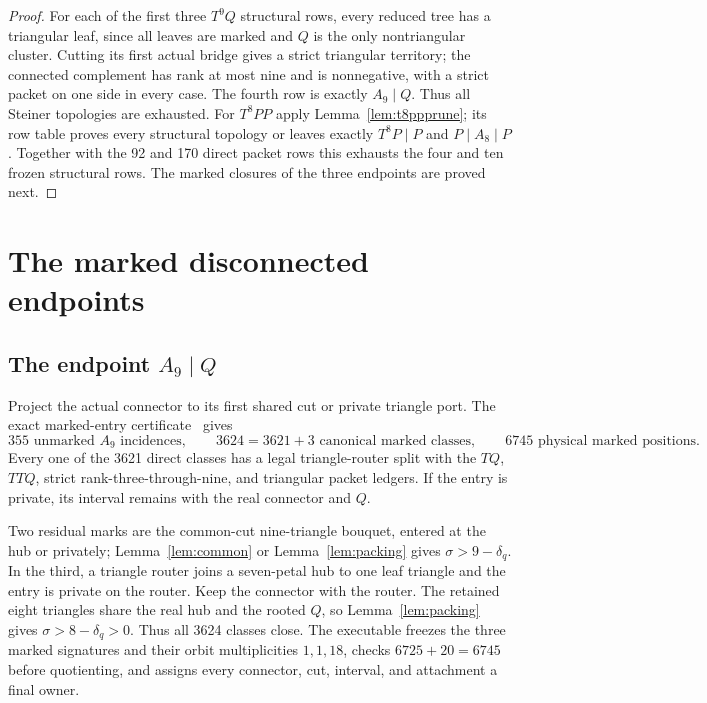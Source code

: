 \documentclass[11pt]{article}
\newcommand{\sig}{\sigma}
\begin{document}
\begin{proof}
For each of the first three $T^9Q$ structural rows, every reduced tree has a
triangular leaf, since all leaves are marked and $Q$ is the only nontriangular
cluster.  Cutting its first actual bridge gives a strict triangular territory;
the connected complement has rank at most nine and is nonnegative, with a
strict packet on one side in every case.  The fourth row is exactly
$A_9\mid Q$.  Thus all Steiner topologies are exhausted.  For $T^8PP$ apply
Lemma~\ref{lem:t8ppprune}; its row table proves every structural topology or
leaves exactly $T^8P\mid P$ and $P\mid A_8\mid P$.  Together with the 92 and
170 direct packet rows this exhausts the four and ten frozen structural rows.
The marked closures of the three endpoints are proved next.
\end{proof}

\section{The marked disconnected endpoints}

\subsection{The endpoint \texorpdfstring{$A_9\mid Q$}{A9 | Q}}

Project the actual connector to its first shared cut or private triangle port.
The exact marked-entry certificate~\cite{T9QMarked} gives
\[
 355\text{ unmarked }A_9\text{ incidences},\qquad
 3624=3621+3\text{ canonical marked classes},\qquad
 6745\text{ physical marked positions}.
\]
Every one of the 3621 direct classes has a legal triangle-router split with
the $TQ$, $TTQ$, strict rank-three-through-nine, and triangular packet ledgers.
If the entry is private, its interval remains with the real connector and $Q$.

Two residual marks are the common-cut nine-triangle bouquet, entered at the
hub or privately; Lemma~\ref{lem:common} or Lemma~\ref{lem:packing} gives
$\sig>9-\delta_q$.  In the third, a triangle router joins a seven-petal hub to
one leaf triangle and the entry is private on the router.  Keep the connector
with the router.  The retained eight triangles share the real hub and the
rooted $Q$, so Lemma~\ref{lem:packing} gives $\sig>8-\delta_q>0$.  Thus all
3624 classes close.  The executable freezes the three marked signatures and
their orbit multiplicities $1,1,18$, checks $6725+20=6745$ before quotienting,
and assigns every connector, cut, interval, and attachment a final owner.
\end{document}
